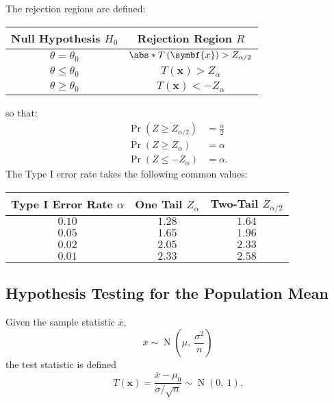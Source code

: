 \documentclass{article}
\begin{document}
The rejection regions are defined:
\begin{center}
    \begin{tabular}{cc}
        \toprule
        \textbf{Null Hypothesis} \(H_0\) & \textbf{Rejection Region} \(R\)                     \\
        \midrule
        \(\theta = \theta_0\)            & \(\abs*{T\left( \symbf{x} \right)} > Z_{\alpha/2}\) \\
        \(\theta \leq \theta_0\)         & \(T\left( \symbf{x} \right) > Z_{\alpha}\)          \\
        \(\theta \geq \theta_0\)         & \(T\left( \symbf{x} \right) < -Z_{\alpha}\)         \\
        \bottomrule
    \end{tabular}
\end{center}
so that:
\begin{align*}
    \Pr{\left( Z \geq Z_{\alpha / 2} \right)} & = \frac{\alpha}{2} \\
    \Pr{\left( Z \geq Z_{\alpha} \right)}     & = \alpha           \\
    \Pr{\left( Z \leq -Z_{\alpha} \right)}    & = \alpha.
\end{align*}
The Type I error rate takes the following common values:
\begin{center}
    \begin{tabular}{ccc}
        \toprule
        \textbf{Type I Error Rate} \(\alpha\) & \textbf{One Tail} \(Z_{\alpha}\) & \textbf{Two-Tail} \(Z_{\alpha/2}\) \\
        \midrule
        \(0.10\)                              & \(1.28\)                         & \(1.64\)                           \\
        \(0.05\)                              & \(1.65\)                         & \(1.96\)                           \\
        \(0.02\)                              & \(2.05\)                         & \(2.33\)                           \\
        \(0.01\)                              & \(2.33\)                         & \(2.58\)                           \\
        \bottomrule
    \end{tabular}
\end{center}
\subsection{Hypothesis Testing for the Population Mean}
Given the sample statistic \(\overline{x}\),
\begin{equation*}
    \overline{x} \sim \operatorname{N}\left( \mu,\: \frac{\sigma^2}{n} \right)
\end{equation*}
the test statistic is defined
\begin{equation*}
    T\left( \symbf{x} \right) = \frac{\overline{x} - \mu_0}{\sigma/\sqrt{n}} \sim \operatorname{N}\left( 0,\: 1 \right).
\end{equation*}
\end{document}
